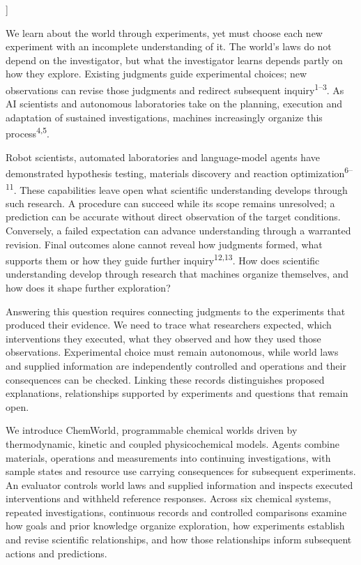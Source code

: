 \documentclass[10pt,a4paper]{article}
\begin{document}
\vspace{8pt}]



We learn about the world through experiments, yet must choose each new experiment with an incomplete understanding of it. The world's laws do not depend on the investigator, but what the investigator learns depends partly on how they explore. Existing judgments guide experimental choices; new observations can revise those judgments and redirect subsequent inquiry\textsuperscript{1--3}. As AI scientists and autonomous laboratories take on the planning, execution and adaptation of sustained investigations, machines increasingly organize this process\textsuperscript{4,5}.

Robot scientists, automated laboratories and language-model agents have demonstrated hypothesis testing, materials discovery and reaction optimization\textsuperscript{6--11}. These capabilities leave open what scientific understanding develops through such research. A procedure can succeed while its scope remains unresolved; a prediction can be accurate without direct observation of the target conditions. Conversely, a failed expectation can advance understanding through a warranted revision. Final outcomes alone cannot reveal how judgments formed, what supports them or how they guide further inquiry\textsuperscript{12,13}. How does scientific understanding develop through research that machines organize themselves, and how does it shape further exploration?

Answering this question requires connecting judgments to the experiments that produced their evidence. We need to trace what researchers expected, which interventions they executed, what they observed and how they used those observations. Experimental choice must remain autonomous, while world laws and supplied information are independently controlled and operations and their consequences can be checked. Linking these records distinguishes proposed explanations, relationships supported by experiments and questions that remain open.

We introduce ChemWorld, programmable chemical worlds driven by thermodynamic, kinetic and coupled physicochemical models. Agents combine materials, operations and measurements into continuing investigations, with sample states and resource use carrying consequences for subsequent experiments. An evaluator controls world laws and supplied information and inspects executed interventions and withheld reference responses. Across six chemical systems, repeated investigations, continuous records and controlled comparisons examine how goals and prior knowledge organize exploration, how experiments establish and revise scientific relationships, and how those relationships inform subsequent actions and predictions.
\end{document}
